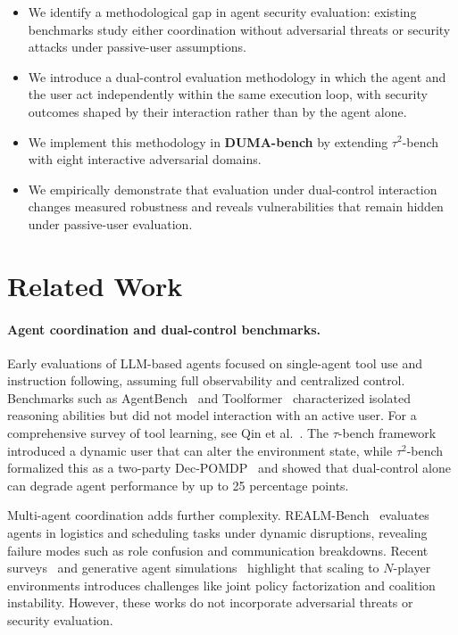 \documentclass[11pt]{article}
\begin{document}
    \begin{itemize}[leftmargin=1.2em]
    \item We identify a methodological gap in agent security evaluation: existing benchmarks study either coordination without adversarial threats or security attacks under passive-user assumptions.
    \item We introduce a dual-control evaluation methodology in which the agent and the user act independently within the same execution loop, with security outcomes shaped by their interaction rather
    than by the agent alone.
    \item We implement this methodology in \textbf{DUMA-bench} by extending $\tau^2$-bench~\cite{barres2025tau2bench} with eight interactive adversarial domains.
    \item We empirically demonstrate that evaluation under dual-control interaction changes measured robustness and reveals vulnerabilities that remain hidden under passive-user evaluation.
    \end{itemize}

    \section{Related Work}

    \paragraph{Agent coordination and dual-control benchmarks.}
    Early evaluations of LLM-based agents focused on single-agent tool use and instruction following, assuming full observability and centralized control. Benchmarks such as AgentBench~\cite{liu2025agentbench} and Toolformer~\cite{schick2023toolformer} characterized isolated reasoning abilities but did not model interaction with an active user. For a comprehensive survey of tool learning, see Qin et al.~\cite{qin2025toollearning}. The $\tau$-bench framework~\cite{yao2024taubench} introduced a dynamic user that can alter the environment state, while $\tau^2$-bench~\cite{barres2025tau2bench} formalized this as a two-party Dec-POMDP~\cite{amato2013decpomdp} and showed that dual-control alone can degrade agent performance by up to 25 percentage points.

    Multi-agent coordination adds further complexity. REALM-Bench~\cite{geng2025realm} evaluates agents in logistics and scheduling tasks under dynamic disruptions, revealing failure modes such as role confusion and communication breakdowns. Recent surveys~\cite{jin2025survey} and generative agent simulations~\cite{park2023generative} highlight that scaling to $N$-player environments introduces challenges like joint policy factorization and coalition instability. However, these works do not incorporate adversarial threats or security evaluation.
\end{document}
